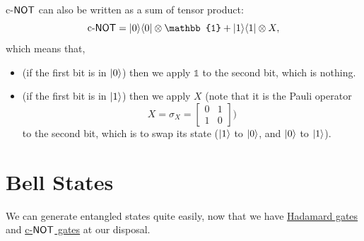 \documentclass[12pt]{article}
\begin{document}
\begin{notation}
c-$\NOT$ can also be written as a sum of tensor product: $$
\text{c-}\NOT = \kb{0}{0}\otimes \mathbb{1} + \kb{1}{1}\otimes X,
$$ which means that,
\begin{itemize}
    \item (if the first bit is in $\Ket{0}$) then we apply $\mathbb{1}$ to the second bit, which is nothing.
    \item (if the first bit is in $\Ket{1}$) then we apply $X$ (note that it is the Pauli operator $$X = \sigma_X = \begin{bmatrix}
        0 & 1\\
        1 & 0
    \end{bmatrix})$$ to the second bit, which is to swap its state ($\Ket{1}$ to $\Ket{0}$, and $\Ket{0}$ to $\Ket{1}$).
\end{itemize}
\end{notation}

\section{Bell States}
We can generate entangled states quite easily, now that we have \underline{Hadamard gates} and \underline{c-$\NOT$ gates} at our disposal.
\end{document}
